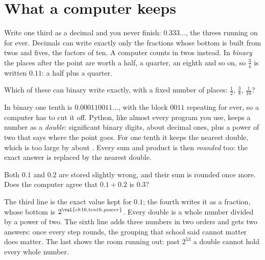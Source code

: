 \section{What a computer keeps}
\label{sec:ch16-keeps}

\noindent
Write one third as a decimal and you never finish: $\num{0.333}\ldots$, the
threes running on for ever. Decimals can write exactly only the fractions
whose bottom is built from twos and fives, the factors of ten. A computer
counts in twos instead. In \emph{binary} the places after the point are worth
a half, a quarter, an eighth and so on, so $\tfrac{3}{4}$ is written
$\num{0.11}$: a half plus a quarter.

\begin{think}
Which of these can binary write exactly, with a fixed number of places:
$\tfrac{1}{2}$, $\tfrac{3}{8}$, $\tfrac{1}{10}$?
\end{think}
In binary one tenth is $\num{0.000110011}\ldots$, with the block $0011$
repeating for ever, so a computer has to cut it off. Python, like almost
every program you use, keeps a number as a \emph{double}:
 significant binary digits, about
 decimal ones, plus a power of two that says where
the point goes. For one tenth it keeps the nearest double, which is too large
by about . Every sum and product is then \emph{rounded}
too: the exact answer is replaced by the nearest double.

\begin{think}
Both $\num{0.1}$ and $\num{0.2}$ are stored slightly wrong, and their sum is
rounded once more. Does the computer agree that $\num{0.1} + \num{0.2}$ is
$\num{0.3}$?
\end{think}



\noindent
The third line is the exact value kept for $\num{0.1}$; the fourth writes it
as a fraction, whose bottom is $2^{\val{ch16.tenth.power}}$. Every double is
a whole number divided by a power of two. The sixth line adds three numbers
in two orders and gets two answers: once every step rounds, the grouping that
school said cannot matter does matter. The last shows the room running out:
past $2^{53}$ a double cannot hold every whole number.

